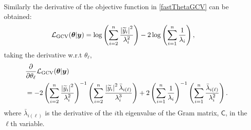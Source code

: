 \documentclass{svjour3}                     %
\newcommand{\bm}[1]{\boldsymbol{#1}}
\newcommand{\vtheta}{{\bm{\theta}}}
\newcommand{\vy}{\bm{y}}
\newcommand{\mC}{\mathsf{C}}
\newcommand{\GCV}{\textup{GCV}}
\def\abs#1{\ensuremath{\left \lvert #1 \right \rvert}}
\begin{document}
Similarly the derivative of the objective function in \eqref{fastThetaGCV} can be obtained:
\begin{align*}
\mathcal{L}_\GCV(\vtheta | \vy)
&= \log \left ( \sum_{i=2}^n \frac{\abs{\widetilde{y}_i}^2}{\lambda_i^2} 
\right) -2\log\left( \sum_{i=1}^n \frac{1}{\lambda_i} \right), 
\end{align*}
taking the derivative w.r.t $\theta_\ell$,
\begin{align}
\nonumber
& \frac{\partial}{\partial \theta_\ell}  \mathcal{L}_\GCV(\vtheta | \vy)
\\
\label{eqn:deriv_obj_func_full}
&= -2 \left ( \sum_{i=2}^n \frac{\abs{\widetilde{y}_i}^2}{\lambda_i^2} \right)^{-1}
\left ( \sum_{i=2}^n \frac{\abs{\widetilde{y}_i}^2 \bar{\lambda}_{i(\ell)} }{\lambda_i^3}    \right)
+ 2 \left( \sum_{i=1}^n \frac{1}{\lambda_i} \right)^{-1}
\left( \sum_{i=1}^n \frac{\bar{\lambda}_{i(\ell)} }{\lambda_i^2}  \right).
\end{align}
where $\bar{\lambda}_{i(\ell)}$ is the derivative of the $i$th eigenvalue of the Gram matrix, $\mC$, in the $\ell$th variable. 
\end{document}
